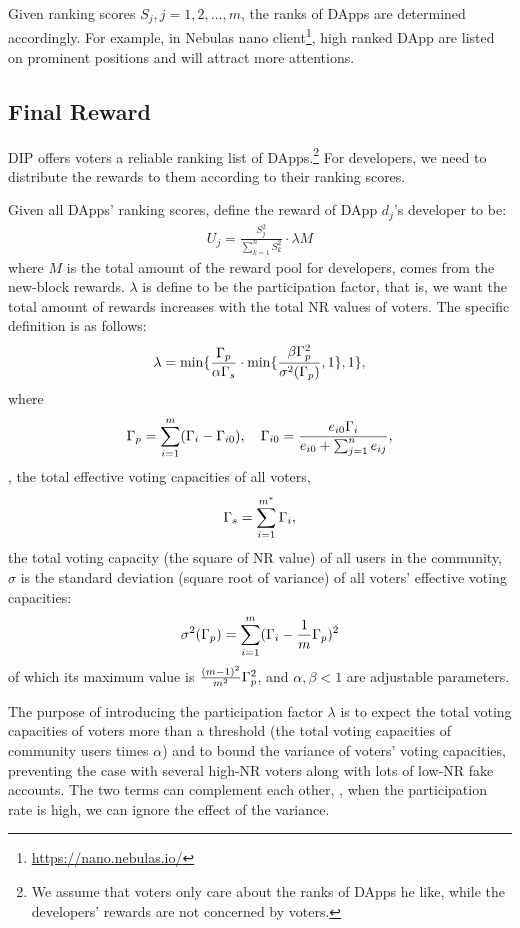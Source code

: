 Given ranking scores $S_j,j=1,2,\ldots,m$, the ranks of DApps are determined accordingly. For example, in Nebulas nano client\footnote{\url{https://nano.nebulas.io/}}, high ranked DApp are listed on prominent positions and will attract more attentions.

\subsection{Final Reward}
\noindent DIP offers voters a reliable ranking list of DApps.\footnote{We assume that voters only care about the ranks of DApps he like, while the developers' rewards are not concerned by voters.} For developers, we need to distribute the rewards to them according to their ranking scores.

Given all DApps' ranking scores, define the reward of DApp $d_j$'s developer to be:
\begin{align}
	\label{eq:distribution}
	U_j = \frac{S_j^2}{\sum_{k=1}^n S_k^2}\cdot \lambda M
\end{align}
where $M$ is  the total amount of the reward pool for developers, comes from
the new-block rewards. $\lambda $ is define to be the participation factor, that is, we want the total amount of rewards increases with the total NR values of voters. The specific definition is as follows:
\begin{align}
	\label{eq:participation}
	\lambda=\min\{\frac{\Gamma_p}{\alpha \Gamma_s }\cdot \min\{\frac{\beta\Gamma_p^2 }{\sigma^2(\Gamma_p)},1\},1\},
\end{align}
\noindent where $$\Gamma_p = \sum_{i=1}^m (\Gamma_i-\Gamma_{i0}),\quad \Gamma_{i0} = \frac{e_{i0}\Gamma_i}{e_{i0}+\sum_{j=1}^n {e_{ij}}},$$ \ie, the total effective voting capacities of all voters,
$$\Gamma_s = \sum_{i=1}^{m^*} \Gamma_i,$$
\noindent the total voting capacity (the square of NR value) of all users in the community, $\sigma$ is the standard deviation (square root of variance) of all voters' effective voting capacities:
$$ \sigma^2(\Gamma_p) = \sum_{i=1}^m (\Gamma_i-\frac{1}{m}\Gamma_p)^2 $$
of which its maximum value is $\frac{(m-1)^2}{m^2}\Gamma_p^2$, and $\alpha,\beta < 1$ are adjustable parameters.

The purpose of introducing the participation factor $\lambda$ is to expect the total voting capacities of voters more than a threshold (the total voting capacities of  community users times $\alpha$)  and to bound the variance of voters’ voting capacities, preventing the case with several high-NR voters along with lots of low-NR fake accounts. The two terms can complement each other, \ie, when the participation rate is high, we can ignore the effect of the variance.
